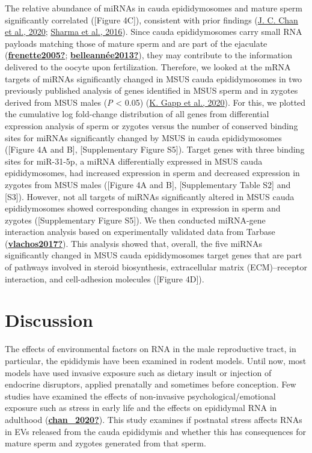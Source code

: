 \documentclass[12pt,twoside]{reedthesis}
\begin{document}
The relative abundance of miRNAs in cauda epididymosomes and mature
sperm significantly correlated ({[}Figure 4C{]}), consistent
with prior findings (\protect\hyperlink{ref-chan2020}{J. C. Chan et al., 2020}; \protect\hyperlink{ref-sharma2016}{Sharma et al., 2016}). Since cauda epididymosomes
carry small RNA payloads matching those of mature sperm and are part of
the ejaculate (\protect\hyperlink{ref-frenette2005}{\textbf{frenette2005?}}; \protect\hyperlink{ref-belleannuxe9e2013}{\textbf{belleannée2013?}}), they may contribute to
the information delivered to the oocyte upon fertilization. Therefore,
we looked at the mRNA targets of miRNAs significantly changed in MSUS
cauda epididymosomes in two previously published analysis of genes
identified in MSUS sperm and in zygotes derived from MSUS males
(\emph{P} \textless{} 0.05) (\protect\hyperlink{ref-gapp2020}{K. Gapp et al., 2020}). For this, we plotted the cumulative log
fold-change distribution of all genes from differential expression
analysis of sperm or zygotes versus the number of conserved binding
sites for miRNAs significantly changed by MSUS in cauda epididymosomes
({[}Figure 4A and B{]}, {[}Supplementary Figure
S5{]}).
Target genes with three binding sites for miR-31-5p, a miRNA
differentially expressed in MSUS cauda epididymosomes, had increased
expression in sperm and decreased expression in zygotes from MSUS males
({[}Figure 4A and B{]}, {[}Supplementary Table
S2{]}
and
{[}S3{]}).
However, not all targets of miRNAs significantly altered in MSUS cauda
epididymosomes showed corresponding changes in expression in sperm and
zygotes ({[}Supplementary Figure
S5{]}).
We then conducted miRNA-gene interaction analysis based on
experimentally validated data from Tarbase (\protect\hyperlink{ref-vlachos2017}{\textbf{vlachos2017?}}). This analysis
showed that, overall, the five miRNAs significantly changed in MSUS
cauda epididymosomes target genes that are part of pathways involved in
steroid biosynthesis, extracellular matrix (ECM)--receptor interaction,
and cell-adhesion molecules ({[}Figure 4D{]}).

\hypertarget{discussion-1}{%
\section{Discussion}\label{discussion-1}}

The effects of environmental factors on RNA in the male reproductive
tract, in particular, the epididymis have been examined in rodent
models. Until now, most models have used invasive exposure such as
dietary insult or injection of endocrine disruptors, applied prenatally
and sometimes before conception. Few studies have examined the effects
of non-invasive psychological/emotional exposure such as stress in early
life and the effects on epididymal RNA in adulthood (\protect\hyperlink{ref-chan_2020}{\textbf{chan\_2020?}}). This
study examines if postnatal stress affects RNAs in EVs released from the
cauda epididymis and whether this has consequences for mature sperm and
zygotes generated from that sperm.
\end{document}
